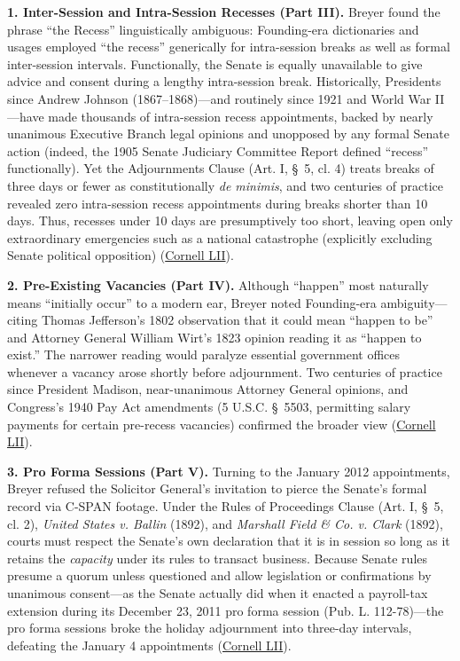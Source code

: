 \documentclass[12pt]{article}
\begin{document}
\textbf{1. Inter-Session and Intra-Session Recesses (Part III).} Breyer found the phrase ``the Recess'' linguistically ambiguous: Founding-era dictionaries and usages employed ``the recess'' generically for intra-session breaks as well as formal inter-session intervals. Functionally, the Senate is equally unavailable to give advice and consent during a lengthy intra-session break. Historically, Presidents since Andrew Johnson (1867--1868)---and routinely since 1921 and World War II---have made thousands of intra-session recess appointments, backed by nearly unanimous Executive Branch legal opinions and unopposed by any formal Senate action (indeed, the 1905 Senate Judiciary Committee Report defined ``recess'' functionally). Yet the Adjournments Clause (Art. I, \S~5, cl. 4) treats breaks of three days or fewer as constitutionally \emph{de minimis}, and two centuries of practice revealed zero intra-session recess appointments during breaks shorter than 10 days. Thus, recesses under 10 days are presumptively too short, leaving open only extraordinary emergencies such as a national catastrophe (explicitly excluding Senate political opposition) (\href{https://www.law.cornell.edu/supremecourt/text/12-1281}{Cornell LII}).

\textbf{2. Pre-Existing Vacancies (Part IV).} Although ``happen'' most naturally means ``initially occur'' to a modern ear, Breyer noted Founding-era ambiguity---citing Thomas Jefferson's 1802 observation that it could mean ``happen to be'' and Attorney General William Wirt's 1823 opinion reading it as ``happen to exist.'' The narrower reading would paralyze essential government offices whenever a vacancy arose shortly before adjournment. Two centuries of practice since President Madison, near-unanimous Attorney General opinions, and Congress's 1940 Pay Act amendments (5 U.S.C. \S~5503, permitting salary payments for certain pre-recess vacancies) confirmed the broader view (\href{https://www.law.cornell.edu/supremecourt/text/12-1281}{Cornell LII}).

\textbf{3. Pro Forma Sessions (Part V).} Turning to the January 2012 appointments, Breyer refused the Solicitor General's invitation to pierce the Senate's formal record via C-SPAN footage. Under the Rules of Proceedings Clause (Art. I, \S~5, cl. 2), \emph{United States v. Ballin} (1892), and \emph{Marshall Field \& Co. v. Clark} (1892), courts must respect the Senate's own declaration that it is in session so long as it retains the \emph{capacity} under its rules to transact business. Because Senate rules presume a quorum unless questioned and allow legislation or confirmations by unanimous consent---as the Senate actually did when it enacted a payroll-tax extension during its December 23, 2011 pro forma session (Pub. L. 112-78)---the pro forma sessions broke the holiday adjournment into three-day intervals, defeating the January 4 appointments (\href{https://www.law.cornell.edu/supremecourt/text/12-1281}{Cornell LII}).
\end{document}
